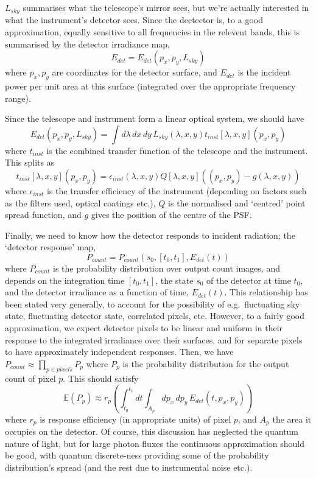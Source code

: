 $L_{sky}$ summarises what the telescope's mirror sees, but we're
actually interested in what the instrument's detector sees. Since
the dectector is, to a good approximation, equally sensitive to all
frequencies in the relevent bands, this is summarised by the detector irradiance map,
\[
E_{det} = E_{det} (p_x, p_y, L_{sky})
\]
where $p_x, p_y$ are coordinates for the detector surface, and
$E_{det}$ is the incident power per unit area at this surface
(integrated over the appropriate frequency range).

Since the telescope and instrument form a linear optical system,
we should have
\[
E_{det}(p_x, p_y, L_{sky}) = \int d\lambda\, dx\, dy\, L_{sky}(\lambda, x, y) t_{inst}[\lambda, x, y](p_x, p_y)
\]
where $t_{inst}$ is the combined transfer function of the telescope and the instrument.
This splits as 
\[
t_{inst}[\lambda,x, y](p_x, p_y) = \epsilon_{inst} (\lambda, x, y)
Q[\lambda, x, y]((p_x, p_y) - g (\lambda, x, y))
\]
where $\epsilon_{inst}$ is the transfer efficiency of the instrument
(depending on factors such as the filters used, optical coatings etc.),
$Q$ is the normalised and `centred' point spread function, and $g$ gives
the position of the centre of the PSF.

Finally, we need to know how the detector responds to incident radiation;
the `detector response' map,
\[
P_{count} = P_{count} (s_0, [t_0, t_1], E_{det}(t))
\]
where $P_{count}$ is the probability distribution over output count images,
and depends on the integration time $[t_0, t_1]$, the state $s_0$ of the detector
at time $t_0$, and the detector irradiance as a function of time, $E_{det}(t)$.
This relationship has been stated very generally, to account for the possibility
of e.g.\ fluctuating sky state, fluctuating detector state, correlated pixels, etc.
However, to a fairly good approximation, we expect detector pixels to be linear
and uniform in their response to the integrated irradiance over their surfaces,
and for separate pixels to have approximately independent responses. Then,
we have
$P_{count} \approx \prod_{p \in pixels} P_p$
where $P_p$ is the probability distribution for the output count of pixel $p$.
This should satisfy
\[
\mathbb{E}(P_p) \approx r_p \left (\int_{t_0}^{t_1} dt \int_{A_p} dp_x\, dp_y\, E_{det}(t, p_x, p_y)\right)
\]
where $r_p$ is response efficiency (in appropriate units) of pixel
$p$, and $A_p$ the area it occupies on the detector. Of course, this
discussion has neglected the quantum nature of light, but for large
photon fluxes the continuous approximation should be good, with quantum
discrete-ness providing some of the probability distribution's spread
(and the rest due to instrumental noise etc.).

